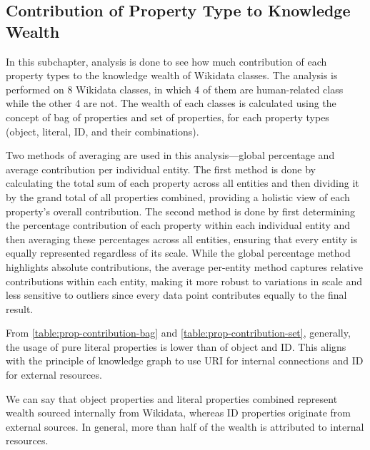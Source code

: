 \subsection{Contribution of Property Type to Knowledge Wealth} \label{wealth & proptype contribution}

In this subchapter, analysis is done to see how much contribution of each property types to the knowledge wealth of Wikidata classes. The analysis is performed on 8 Wikidata classes, in which 4 of them are human-related class while the other 4 are not. The wealth of each classes is calculated using the concept of bag of properties and set of properties, for each property types (object, literal, ID, and their combinations).

Two methods of averaging are used in this analysis—global percentage and average contribution per individual entity. The first method is done by calculating the total sum of each property across all entities and then dividing it by the grand total of all properties combined, providing a holistic view of each property's overall contribution. The second method is done by first determining the percentage contribution of each property within each individual entity and then averaging these percentages across all entities, ensuring that every entity is equally represented regardless of its scale. While the global percentage method highlights absolute contributions, the average per-entity method captures relative contributions within each entity, making it more robust to variations in scale and less sensitive to outliers since every data point contributes equally to the final result.

From \autoref{table:prop-contribution-bag} and \autoref{table:prop-contribution-set}, generally, the usage of pure literal properties is lower than of object and ID. This aligns with the principle of knowledge graph to use URI for internal connections and ID for external resources.

We can say that object properties and literal properties combined represent wealth sourced internally from Wikidata, whereas ID properties originate from external sources. In general, more than half of the wealth is attributed to internal resources.

